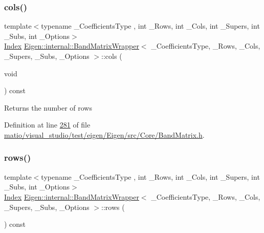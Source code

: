 \subsubsection{\texorpdfstring{cols()}{cols()}\hspace{0.1cm}{\footnotesize\ttfamily [2/2]}}
{\footnotesize\ttfamily template$<$typename \+\_\+\+Coefficients\+Type , int \+\_\+\+Rows, int \+\_\+\+Cols, int \+\_\+\+Supers, int \+\_\+\+Subs, int \+\_\+\+Options$>$ \\
\hyperlink{group___core___module_a554f30542cc2316add4b1ea0a492ff02}{Index} \hyperlink{class_eigen_1_1internal_1_1_band_matrix_wrapper}{Eigen\+::internal\+::\+Band\+Matrix\+Wrapper}$<$ \+\_\+\+Coefficients\+Type, \+\_\+\+Rows, \+\_\+\+Cols, \+\_\+\+Supers, \+\_\+\+Subs, \+\_\+\+Options $>$\+::cols (\begin{DoxyParamCaption}\item[{void}]{ }\end{DoxyParamCaption}) const\hspace{0.3cm}{\ttfamily [inline]}}

\begin{DoxyReturn}{Returns}
the number of rows 
\end{DoxyReturn}


Definition at line \hyperlink{matio_2visual__studio_2test_2eigen_2_eigen_2src_2_core_2_band_matrix_8h_source_l00281}{281} of file \hyperlink{matio_2visual__studio_2test_2eigen_2_eigen_2src_2_core_2_band_matrix_8h_source}{matio/visual\+\_\+studio/test/eigen/\+Eigen/src/\+Core/\+Band\+Matrix.\+h}.

\mbox{\label{class_eigen_1_1internal_1_1_band_matrix_wrapper_a8d23b9d25729ac15c06591c810d13160}} 
\subsubsection{\texorpdfstring{rows()}{rows()}\hspace{0.1cm}{\footnotesize\ttfamily [1/2]}}
{\footnotesize\ttfamily template$<$typename \+\_\+\+Coefficients\+Type , int \+\_\+\+Rows, int \+\_\+\+Cols, int \+\_\+\+Supers, int \+\_\+\+Subs, int \+\_\+\+Options$>$ \\
\hyperlink{group___core___module_a554f30542cc2316add4b1ea0a492ff02}{Index} \hyperlink{class_eigen_1_1internal_1_1_band_matrix_wrapper}{Eigen\+::internal\+::\+Band\+Matrix\+Wrapper}$<$ \+\_\+\+Coefficients\+Type, \+\_\+\+Rows, \+\_\+\+Cols, \+\_\+\+Supers, \+\_\+\+Subs, \+\_\+\+Options $>$\+::rows (\begin{DoxyParamCaption}{ }\end{DoxyParamCaption}) const\hspace{0.3cm}{\ttfamily [inline]}}

